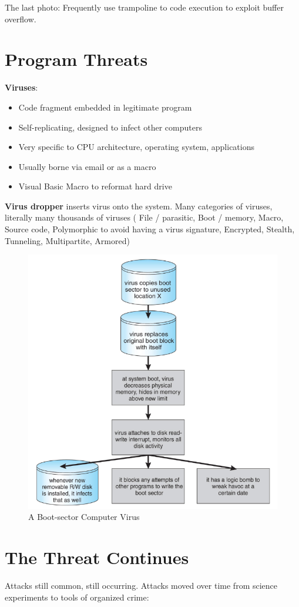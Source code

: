The last photo: Frequently use trampoline to code
execution to exploit buffer
overflow.


\section{Program Threats}

\textbf{Viruses}:

\begin{itemize}
    \item Code fragment embedded in legitimate program
    \item Self-replicating, designed to infect other computers
    \item Very specific to CPU architecture, operating system, applications
    \item Usually borne via email or as a macro
    \item Visual Basic Macro to reformat hard drive
\end{itemize}

\textbf{Virus dropper} inserts virus onto the system. Many categories of viruses, literally many thousands of viruses ( File / parasitic, Boot / memory, Macro, Source code, Polymorphic to avoid having a virus signature, Encrypted, Stealth, Tunneling, Multipartite, Armored)


\begin{figure}[h!]
    \centering
    \includegraphics[width=0.55\linewidth]{img/fgngfn.png}
    \caption{A Boot-sector Computer Virus}
\end{figure}

\section{The Threat Continues}
Attacks still common, still occurring. Attacks moved over time from science experiments to tools of
organized crime:

